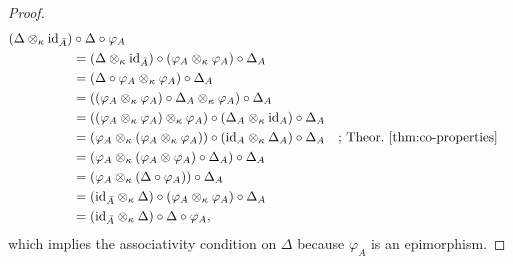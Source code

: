 \begin{proof}
    \begin{align*}
        (\Delta\otimes_\kappa\text{\rm id}_{\bar A})&\circ\Delta\circ\varphi_A\\
            &= (\Delta\otimes_\kappa\text{\rm id}_{\bar A})
                \circ(\varphi_A\otimes_\kappa\varphi_A)\circ\Delta_A\\
        &= (\Delta\circ\varphi_A\otimes_\kappa\varphi_A)\circ\Delta_A\\
        &= ((\varphi_A\otimes_\kappa\varphi_A)
            \circ\Delta_A\otimes_\kappa\varphi_A)\circ\Delta_A\\
        &= ((\varphi_A\otimes_\kappa\varphi_A)\otimes_\kappa\varphi_A)
            \circ(\Delta_A\otimes_\kappa\text{\rm id}_A)\circ\Delta_A\\
        &= (\varphi_A\otimes_\kappa(\varphi_A\otimes_\kappa\varphi_A))
            \circ(\text{\rm id}_A\otimes_\kappa\Delta_A)\circ\Delta_A
                &&\text{; Theor.~\ref{thm:co-properties}}\\
        &= (\varphi_A\otimes_\kappa(\varphi_A\otimes\varphi_A)
            \circ\Delta_A)\circ\Delta_A\\
        &= (\varphi_A\otimes_\kappa(\Delta\circ\varphi_A))
            \circ\Delta_A\\
        &= (\text{\rm id}_{\bar A}\otimes_\kappa\Delta)
            \circ(\varphi_A\otimes_\kappa\varphi_A)\circ\Delta_A\\
        &= (\text{\rm id}_{\bar A}\otimes_\kappa\Delta)
            \circ\Delta\circ\varphi_A,
    \end{align*}
    which implies the associativity condition on $\Delta$ because $\varphi_A$ is an epimorphism.


\end{proof}
